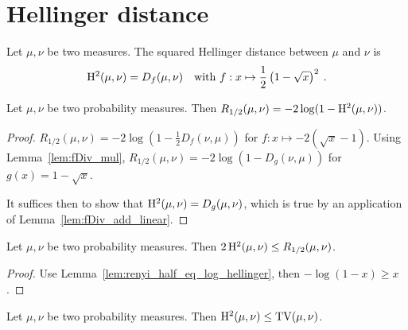 \section{Hellinger distance}

\begin{definition}
  \label{def:Hellinger}
  \leanok
  Let $\mu, \nu$ be two measures. The squared Hellinger distance between $\mu$ and $\nu$ is
  \begin{align*}
    \operatorname{H^2}(\mu, \nu) = D_f(\mu, \nu) \quad \text{with } f: x \mapsto \frac{1}{2}\left( 1 - \sqrt{x} \right)^2 \: .
  \end{align*}
\end{definition}

\begin{lemma}
  \label{lem:renyi_half_eq_log_hellinger}
  Let $\mu, \nu$ be two probability measures. Then $R_{1/2}(\mu, \nu) = -2\log(1 - \operatorname{H^2}(\mu, \nu))$.
\end{lemma}

\begin{proof}
$R_{1/2}(\mu, \nu) = -2 \log (1 - \frac{1}{2} D_f(\nu, \mu))$ for $f : x \mapsto -2 (\sqrt{x} - 1)$. Using Lemma~\ref{lem:fDiv_mul}, $R_{1/2}(\mu, \nu) = -2 \log (1 - D_g(\nu, \mu))$ for $g(x) = 1 - \sqrt{x}$.

It suffices then to show that $\operatorname{H^2}(\mu, \nu) = D_g(\mu, \nu)$, which is true by an application of Lemma~\ref{lem:fDiv_add_linear}.
\end{proof}

\begin{lemma}
  \label{lem:hellinger_le_renyi}
  Let $\mu, \nu$ be two probability measures. Then $2 \operatorname{H^2}(\mu, \nu) \le R_{1/2}(\mu, \nu)$.
\end{lemma}

\begin{proof}
Use Lemma~\ref{lem:renyi_half_eq_log_hellinger}, then $-\log(1 - x) \ge x$.
\end{proof}

\begin{lemma}
  \label{lem:hellinger_le_tv}
  Let $\mu, \nu$ be two probability measures. Then $\operatorname{H^2}(\mu, \nu) \le \operatorname{TV}(\mu, \nu)$.
\end{lemma}


